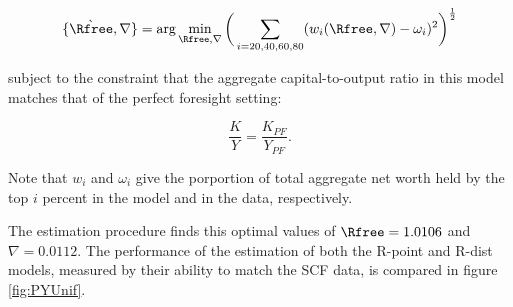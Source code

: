 \documentclass[\econtexRoot/Chp1proposal]{subfiles}
\begin{document}
$$ \{\grave{\Rfree}, \nabla\} = \text{arg}\min_{\Rfree, \nabla} \bigg( \sum_{i=20, 40, 60, 80} (w_{i}(\Rfree, \nabla)-\omega_i )^{2} \bigg)^{\frac{1}{2}} $$

\par subject to the constraint that the aggregate capital-to-output ratio in this model matches that of the perfect foresight setting:

$$ \frac{K}{Y} = \frac{K_{PF}}{Y_{PF}}. $$

\par Note that $w_i$ and $\omega_i$ give the porportion of total aggregate net worth held by the top $i$ percent in the model and in the data, respectively.

\par The estimation procedure finds this optimal values of $\Rfree = 1.0106$ and $\nabla = 0.0112$. The performance of the estimation of both the R-point and R-dist models, measured by their ability to match the SCF data, is compared in figure \ref{fig:PYUnif}.




\onlyinsubfile{}

\end{document}
